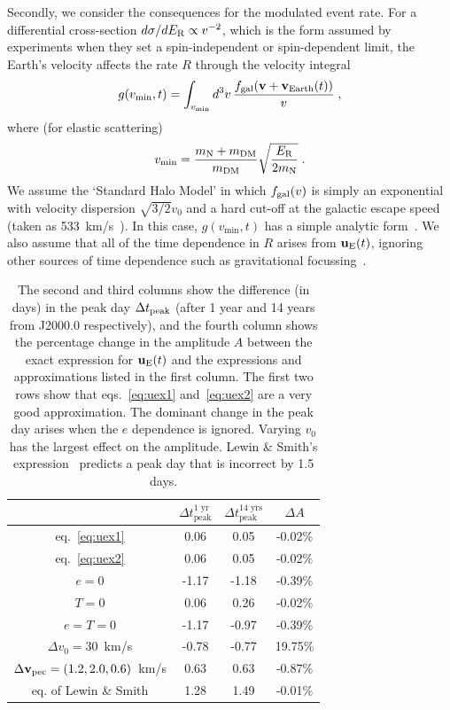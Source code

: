\documentclass[preprintnumbers,a4paper,twocolumn,floats,nofootinbib,superscriptaddress,aps,prd]{revtex4-1}
\begin{document}
Secondly, we consider the consequences for the modulated event rate. For a differential cross-section $d \sigma /d E_{\rm{R}}\propto v^{-2}$, which is the form assumed by experiments when they set a spin-independent or spin-dependent limit, the Earth's velocity affects the rate $R$ through the velocity integral
\begin{equation}
g(v_{\min},t)=\int_{v_{\rm{min}}}d^3v\, \frac{f_{\rm{gal}}(\mathbf{v}+\mathbf{v}_{\rm{Earth}}(t))}{v}\;,
\end{equation}
where (for elastic scattering)
\begin{equation}
v_{\rm{min}}=\frac{m_{\rm{N}}+m_{\rm{DM}}}{m_{\rm{DM}}}\sqrt{\frac{E_{\rm{R}}}{2 m_{\rm{N}}}}\;.
\end{equation}
We assume the `Standard Halo Model' in which $f_{\rm{gal}}(v)$ is simply an exponential with velocity dispersion $\sqrt{3/2}v_0$ and a hard cut-off at the galactic escape speed (taken as 533~km/s~\cite{Piffl:2013mla}). In this case, $g(v_{\min},t)$ has a simple analytic form~\cite{Savage:2008er, McCabe:2010zh}. We also assume that all of the time dependence in $R$ arises from $\mathbf{u}_{\rm{E}}(t)$, ignoring other sources of time dependence such as gravitational focussing~\cite{Lee:2013wza}.

\begingroup
\begin{table}[t!]
\begin{ruledtabular}
\begin{tabular}{c c c c}
 &$\Delta t^{\text{1 yr}}_{\text{peak}}$ & $\Delta t^{\text{14 yrs}}_{\text{peak}}$&$\Delta A$  \\[0.5ex] \hline
eq.~\eqref{eq:uex1} &0.06 & 0.05 &-0.02\% \\ 
eq.~\eqref{eq:uex2}  &0.06 & 0.05 &-0.02\%\\ 
$e=0$& -1.17 & -1.18 & -0.39\% \\
$T=0$& 0.06&0.26 &  -0.02\%\\ 
$e=T=0$ & -1.17&-0.97 & -0.39\% \\ 
$\Delta v_0=30$~km/s& -0.78& -0.77 & 19.75\%\\  
$\Delta \mathbf{v}_{\rm{pec}}=(1.2,2.0,0.6)$~km/s& 0.63& 0.63 & -0.87\%\\  
eq. of Lewin \& Smith& 1.28& 1.49 &-0.01\% \\  
\end{tabular}
\caption{The second and third columns show the difference (in days) in the peak day $\Delta t_{\rm{peak}}$ (after 1 year and 14 years from J2000.0 respectively), and the fourth column shows the percentage change in the amplitude $A$ between the exact expression for $\mathbf{u}_{\rm{E}}(t)$ and the expressions and approximations listed in the first column. The first two rows show that eqs.~\eqref{eq:uex1} and~\eqref{eq:uex2} are a very good approximation. The dominant change in the peak day arises when the $e$ dependence is ignored. Varying $v_0$ has the largest effect on the amplitude. Lewin \& Smith's expression~\cite{Lewin:1995rx} predicts a peak day that is incorrect by 1.5 days.}
\label{tab:pheno}
\end{ruledtabular}
\end{table}
     \endgroup
\end{document}

